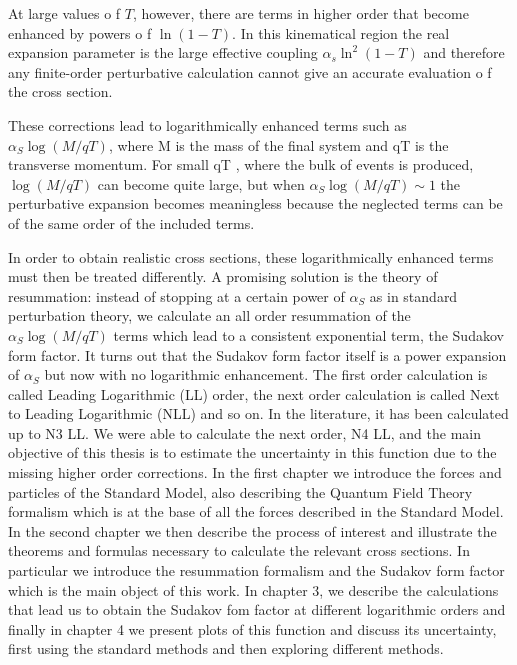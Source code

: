 \documentclass[../main.tex]{subfiles}
\begin{document}
At large values o f $T$, however, there are terms in higher order that become enhanced by powers o f $\ln(1 - T)$.
In this kinematical region the real expansion parameter is the
large effective coupling $\alpha_s \ln^2( 1 - T)$ and therefore
any finite-order perturbative calculation cannot give an accurate evaluation o f the cross section.

These corrections lead to logarithmically enhanced terms such as $\alpha_S \log(M/qT )$, where M is
the mass of the final system and qT is the transverse momentum. For small qT , where the
bulk of events is produced, $\log(M/qT )$ can become quite large, but when $\alpha_S \log(M/qT) \sim 1$ the
perturbative expansion becomes meaningless because the neglected terms can be of the same
order of the included terms.


In order to obtain realistic cross sections, these logarithmically enhanced terms must then be
treated differently. A promising solution is the theory of resummation\cite{CATANI19933}: instead of stopping at a
certain power of $\alpha_S$ as in standard perturbation theory, we calculate an all order resummation
of the $\alpha_S \log(M/qT )$ terms which lead to a consistent exponential term, the Sudakov form
factor. It turns out that the Sudakov form factor itself is a power expansion of $\alpha_S$ but now
with no logarithmic enhancement. The first order calculation is called Leading Logarithmic (LL)
order, the next order calculation is called Next to Leading Logarithmic (NLL) and so on. In the
literature, it has been calculated up to N3 LL. We were able to calculate the next order, N4 LL,
and the main objective of this thesis is to estimate the uncertainty in this function due to the
missing higher order corrections.
In the first chapter we introduce the forces and particles of the Standard Model, also describing
the Quantum Field Theory formalism which is at the base of all the forces described in the
Standard Model. In the second chapter we then describe the process of interest and illustrate
the theorems and formulas necessary to calculate the relevant cross sections. In particular we
introduce the resummation formalism and the Sudakov form factor which is the main object of
this work. In chapter 3, we describe the calculations that lead us to obtain the Sudakov fom
factor at different logarithmic orders and finally in chapter 4 we present plots of this function and
discuss its uncertainty, first using the standard methods and then exploring different methods.
\end{document}
